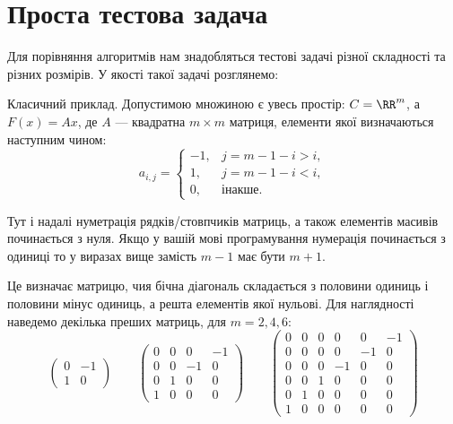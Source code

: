\chapter{Проста тестова задача}

Для порівняння алгоритмів нам знадобляться тестові задачі різної складності та різних розмірів. У якості такої задачі розглянемо:

\begin{problem}
    Класичний приклад. Допустимою множиною є увесь простір: $C = \RR^m$, а $F(x) = Ax$, де $A$ --- квадратна $m \times m$ матриця, елементи якої визначаються наступним чином:
    \begin{equation}
        a_{i,j} = \begin{cases}
            -1, & j = m - 1 - i > i, \\
            1, & j = m - 1 - i < i, \\
            0, & \text{інакше}.
        \end{cases}
    \end{equation}
    
    \begin{remark}
        Тут і надалі нуметрація рядків/стовпчиків матриць, а також елементів масивів починається з нуля. Якщо у вашій мові програмування нумерація починається з одиниці то у виразах вище замість $m - 1$ має бути $m + 1$.
    \end{remark}
    
    Це визначає матрицю, чия бічна діагональ складається з половини одиниць і половини мінус одиниць, а решта елементів якої нульові. Для наглядності наведемо декілька преших матриць, для $m = 2, 4, 6$:
    \begin{equation}
        \begin{pmatrix}
            0 & -1 \\
            1 & 0
        \end{pmatrix}
        \qquad
        \begin{pmatrix}
            0 & 0 & 0 & -1 \\
            0 & 0 & -1 & 0 \\
            0 & 1 & 0 & 0 \\
            1 & 0 & 0 & 0
        \end{pmatrix}
        \qquad
        \begin{pmatrix}
            0 & 0 & 0 & 0 & 0 & -1 \\
            0 & 0 & 0 & 0 & -1 & 0 \\
            0 & 0 & 0 & -1 & 0 & 0 \\
            0 & 0 & 1 & 0 & 0 & 0 \\
            0 & 1 & 0 & 0 & 0 & 0 \\
            1 & 0 & 0 & 0 & 0 & 0
        \end{pmatrix}
    \end{equation}
    

\end{problem}
